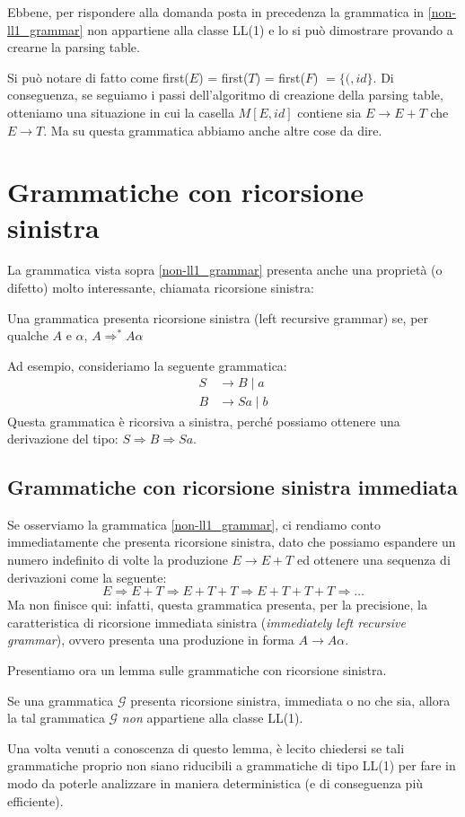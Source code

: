 \documentclass[class=book, crop=false, oneside, 12pt]{standalone}
\begin{document}
Ebbene, per rispondere alla domanda posta in precedenza la grammatica in \ref{non-ll1_grammar} non appartiene alla classe LL(1) e lo si può dimostrare provando a crearne la parsing table.

Si può notare di fatto come first(\(E\)) = first(\(T\)) = first(\(F\)) \(= \{(, id\}\).
Di conseguenza, se seguiamo i passi dell'algoritmo di creazione della parsing table, otteniamo una situazione in cui la casella \(M[E, id]\) contiene sia \(E \to E+T\) che \(E \to T\). Ma su questa grammatica abbiamo anche altre cose da dire.

\section{Grammatiche con ricorsione sinistra}
La grammatica vista sopra \ref{non-ll1_grammar} presenta anche una proprietà (o difetto) molto interessante, chiamata ricorsione sinistra:
\begin{definition}
    Una grammatica presenta ricorsione sinistra (left recursive grammar) se, per qualche \(A\) e \(\alpha\), \(A \Rightarrow^* A\alpha\)
\end{definition}

Ad esempio, consideriamo la seguente grammatica:
\begin{align*}
    S &\to B \mid a \\
    B &\to Sa \mid b
\end{align*}
Questa grammatica è ricorsiva a sinistra, perché possiamo ottenere una derivazione del tipo: \(S \Rightarrow B \Rightarrow Sa\).

\subsection{Grammatiche con ricorsione sinistra immediata}
Se osserviamo la grammatica \ref{non-ll1_grammar}, ci rendiamo conto immediatamente che presenta ricorsione sinistra, dato che possiamo espandere un numero indefinito di volte la produzione \(E \to E+T\) ed ottenere una sequenza di derivazioni come la seguente:
\begin{equation*}
    E \Rightarrow E+T \Rightarrow E+T+T \Rightarrow E+T+T+T \Rightarrow \dots
\end{equation*}
Ma non finisce qui: infatti, questa grammatica presenta, per la precisione, la caratteristica di ricorsione immediata sinistra (\emph{immediately left recursive grammar}), ovvero presenta una produzione in forma \(A \to A\alpha\).

Presentiamo ora un lemma sulle grammatiche con ricorsione sinistra.
\begin{lemma}\label{ll1-leftrec}
    Se una grammatica \(\mathcal{G}\) presenta ricorsione sinistra, immediata o no che sia, allora la tal grammatica \(\mathcal{G}\) \emph{non} appartiene alla classe LL(1).
\end{lemma}
Una volta venuti a conoscenza di questo lemma, è lecito chiedersi se tali grammatiche proprio non siano riducibili a grammatiche di tipo LL(1) per fare in modo da poterle analizzare in maniera deterministica (e di conseguenza più efficiente).
\end{document}
